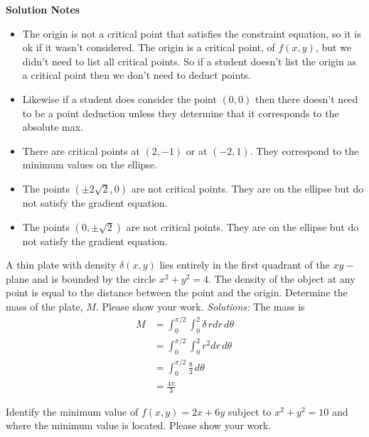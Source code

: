 {    
    \textbf{Solution Notes}
    \begin{itemize}
        \item The origin is not a critical point that satisfies the constraint equation, so it is ok if it wasn't considered. The origin is a critical point, of $f(x,y)$, but we didn't need to list all critical points. So if a student doesn't list the origin as a critical point then we don't need to deduct points. 
        \item Likewise if a student does consider the point $(0,0)$ then there doesn't need to be a point deduction unless they determine that it corresponds to the absolute max. 
        \item There are critical points at $(2,-1)$ or at $(-2,1)$. They correspond to the minimum values on the ellipse. 
        \item The points $(\pm 2\sqrt2,0)$ are not critical points. They are on the ellipse but do not satisfy the gradient equation. 
        \item The points $(0,\pm \sqrt2)$ are not critical points. They are on the ellipse but do not satisfy the gradient equation. 
    \end{itemize}    
}
\else 
      \vspace{11cm}
\fi
    
\fi


\ifnum {}
\question[4] A thin plate with density $\delta(x,y)$ lies entirely in the first quadrant of the $xy-$plane and is bounded by the circle $x^2+y^2=4$. The density of the object at any point is equal to the distance between the point and the origin. Determine the mass of the plate, $M$. Please show your work. 
    \ifnum {} 
    {\color{DarkBlue} \textit{Solutions:}
    The mass is
    \begin{align}
        M &= \int_0^{\pi/2} \int_{0}^{2} \delta \, r dr \, d\theta \\
        &= \int_0^{\pi/2} \int_{0}^{2} r^2 dr \, d\theta \\
        &= \int_0^{\pi/2} \frac83  \, d\theta \\
        &= \frac{4\pi}{3}
    \end{align}
    }
\fi 
\fi


\ifnum {}
\question[4] Identify the minimum value of $f(x,y) = 2x+6y$ subject to $x^2+y^2=10$ and where the minimum value is located. Please show your work. 

